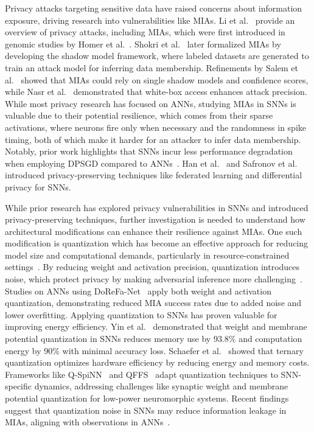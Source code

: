 \noindent
Privacy attacks targeting sensitive data have raised concerns about information exposure, driving research into vulnerabilities like MIAs. Li et al.~\cite{liu2021machine} provide an overview of privacy attacks, including MIAs, which were first introduced in genomic studies by Homer et al.~\cite{homer2008resolving}. Shokri et al.~\cite{shokri} later formalized MIAs by developing the shadow model framework, where labeled datasets are generated to train an attack model for inferring data membership. Refinements by Salem et al.~\cite{salem2018ml} showed that MIAs could rely on single shadow models and confidence scores, while Nasr et al.~\cite{nasr2019comprehensive} demonstrated that white-box access enhances attack precision. While most privacy research has focused on ANNs, studying MIAs in SNNs is valuable due to their potential resilience, which comes from their sparse activations, where neurons fire only when necessary and the randomness in spike timing, both of which make it harder for an attacker to infer data membership. Notably, prior work highlights that SNNs incur less performance degradation when employing DPSGD compared to ANNs~\cite{Moshruba2024AreNA}. Han et al.~\cite{han2023towards} and Safronov et al.~\cite{kim2022privatesnn} introduced privacy-preserving techniques like federated learning and differential privacy for SNNs.

While prior research has explored privacy vulnerabilities in SNNs and introduced privacy-preserving techniques, further investigation is needed to understand how architectural modifications can enhance their resilience against MIAs. One such modification is quantization which has become an effective approach for reducing model size and computational demands, particularly in resource-constrained settings~\cite{yang2019quantization}. By reducing weight and activation precision, quantization introduces noise, which  protect privacy by making adversarial inference more challenging~\cite{kang2024effect}. Studies on ANNs using DoReFa-Net~\cite{kowalski2022towards, famili2023deep, wei2024q} apply both weight and activation quantization, demonstrating reduced MIA success rates due to added noise and lower overfitting. Applying quantization to SNNs has proven valuable for improving energy efficiency. Yin et al.~\cite{yin2024mint} demonstrated that weight and membrane potential quantization in SNNs reduces memory use by 93.8\% and computation energy by 90\% with minimal accuracy loss. Schaefer et al.~\cite{schaefer2020quantizing, schaefer2023hardware} showed that ternary quantization optimizes hardware efficiency by reducing energy and memory costs. Frameworks like Q-SpiNN~\cite{putra2021q} and QFFS~\cite{li2022quantization} adapt quantization techniques to SNN-specific dynamics, addressing challenges like synaptic weight and membrane potential quantization for low-power neuromorphic systems. Recent findings suggest that quantization noise in SNNs may reduce information leakage in MIAs, aligning with observations in ANNs~\cite{kang2024effect, famili2023deep}. 

